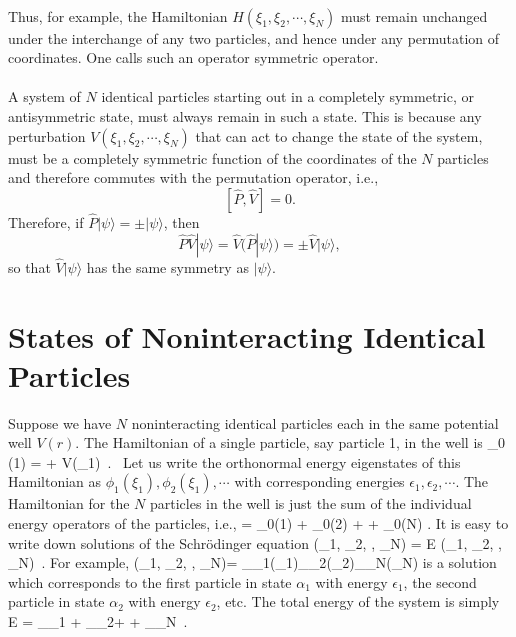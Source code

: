 \paragraph{}
Thus, for example, the Hamiltonian $H(\xi_1, \xi_2, \cdots, \xi_N)$ must remain unchanged under the interchange of any two particles, 
and hence under any permutation of coordinates. One calls such an operator symmetric operator.

\paragraph{}
A system of $N$ identical particles starting out in a completely symmetric, or antisymmetric state, must always remain in such a state.
This is because any perturbation $V(\xi_1, \xi_2, \cdots, \xi_N)$ that can act to change the state of the system, must be a completely symmetric function of the coordinates of the $N$ particles and therefore commutes with the permutation operator, i.e.,
\[ [\hat{P}, \hat{V}]= 0 . \]
Therefore, if $\hat{P}|\psi\rangle = \pm |\psi\rangle$, then
\[ \hat{P}\hat{V}|\psi\rangle = \hat{V}(\hat{P}|\psi\rangle) = \pm \hat{V}|\psi\rangle, \]
so that $\hat{V}|\psi\rangle$ has the same symmetry as $|\psi\rangle$.



\section{States of Noninteracting Identical Particles}
Suppose we have $N$ noninteracting identical particles each in the same potential well $V(r)$. The Hamiltonian of a single particle,
say particle 1,  in the well is 
\be
{}_0 (1) =  + V(\xi_1)\, .\
\ee
Let us write the orthonormal energy eigenstates of this Hamiltonian as $\phi_1(\xi_1), \phi_2(\xi_1), \cdots $ with corresponding energies
$\epsilon_1, \epsilon_2, \cdots$. The Hamiltonian for the $N$ particles in the well is just the sum of the individual energy operators of the particles, i.e.,
\be
{}= _0(1) + _0(2) + \cdots + _0(N) .
\ee
It is easy to write down solutions of the Schr\"{o}dinger equation
\be
{}\psi(\xi_1, \xi_2, \cdots, \xi_N) = E \psi(\xi_1, \xi_2, \cdots, \xi_N)\, .
\label{eq:se}
\ee
For example, 
\be
\psi(\xi_1, \xi_2, \cdots, \xi_N)= \phi_{\alpha_1}(\xi_1)\phi_{\alpha_2}(\xi_2)\cdots \phi_{\alpha_N}(\xi_N)
\label{eq:sol1}
\ee
is a solution which corresponds to the first particle in state $\alpha_1$ with energy $\epsilon_1$, the second particle in state
$\alpha_2$ with energy $\epsilon_2$, etc. The total energy of the system is simply
\be
E = \epsilon_{\alpha_1} + \epsilon_{\alpha_2}+ \cdots + \epsilon_{\alpha_N}\, .
\ee

